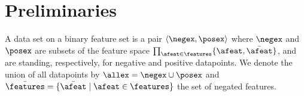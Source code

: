 \documentclass{llncs}
\begin{document}
%
%
%
%
%
%
%

\section{Preliminaries}

A data set on a binary feature set \features is a pair $\langle \negex,\posex \rangle$ where $\negex$ and $\posex$ are subsets of the feature space $\prod_{\afeat \in \features}\{\afeat,\bar{\afeat}\}$, and are standing, respectively, for negative and positive datapoints.
We denote the union of all datapoints by $\allex = \negex \cup \posex$ and $\bar{\features} = \{\bar{\afeat} \mid \afeat \in \features\}$ the set of negated features.
\end{document}
